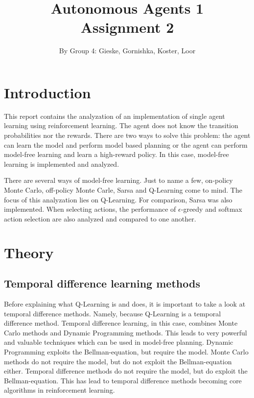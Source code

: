 \documentclass{article}
\begin{document}
\title{Autonomous Agents 1 \\ Assignment 2}

\author{By Group 4: Gieske, Gornishka, Koster, Loor}
\maketitle

\pagebreak

\section*{Introduction}
This report contains the analyzation of an implementation of single agent learning using reinforcement learning. The agent does not know the transition probabilities nor the rewards. There are two ways to solve this problem: the agent can learn the model and perform model based planning or the agent can perform model-free learning and learn a high-reward policy. In this case, model-free learning is implemented and analyzed.

There are several ways of model-free learning. Just to name a few, on-policy Monte Carlo, off-policy Monte Carle, Sarsa and Q-Learning come to mind. The focus of this analyzation lies on Q-Learning. For comparison, Sarsa was also implemented.
When selecting actions, the performance of $\epsilon$-greedy and softmax action selection are also analyzed and compared to one another.
\pagebreak

\section*{Theory}
\subsection*{Temporal difference learning methods}
Before explaining what Q-Learning is and does, it is important to take a look at temporal difference methods. Namely, because Q-Learning is a temporal difference method. Temporal difference learning, in this case, combines Monte Carlo methods and Dynamic Programming methods. This leads to very powerful and valuable techniques which can be used in model-free planning. Dynamic Programming exploits the Bellman-equation, but require the model. Monte Carlo methods do not require the model, but do not exploit the Bellman-equation either. Temporal difference methods do not require the model, but do exploit the Bellman-equation. This has lead to temporal difference methods becoming core algorithms in reinforcement learning.
\end{document}
